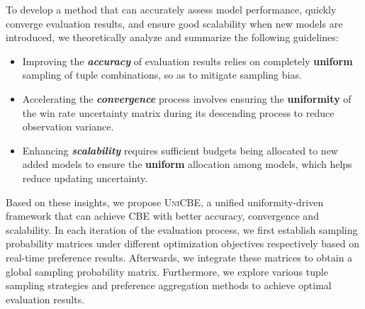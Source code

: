 To develop a method that can accurately assess model performance, quickly converge evaluation results, and ensure good scalability when new models are introduced, we theoretically analyze and summarize the following guidelines:
\begin{itemize}[leftmargin=20pt]
\setlength{\itemsep}{0pt}
\setlength{\parsep}{0pt}
\setlength{\parskip}{0pt}
\item Improving the \textit{\textbf{accuracy}} of evaluation results relies on completely \textbf{uniform} sampling of tuple combinations, so as to mitigate sampling bias.
\item Accelerating the \textit{\textbf{convergence}} process involves ensuring the \textbf{uniformity} of the win rate uncertainty matrix during its descending process to reduce observation variance.
\item Enhancing \textit{\textbf{scalability}} requires sufficient budgets being allocated to new added models to ensure the \textbf{uniform} allocation among models, which helps reduce updating uncertainty.
\end{itemize}
Based on these insights, we propose \textsc{UniCBE}, a unified uniformity-driven framework that can achieve CBE with better accuracy, convergence and scalability. 
In each iteration of the evaluation process, we first establish sampling probability matrices under different optimization objectives respectively based on real-time preference results.
Afterwards, we integrate these matrices to obtain a global sampling probability matrix. 
Furthermore, we explore various tuple sampling strategies and preference aggregation methods to achieve optimal evaluation results.


